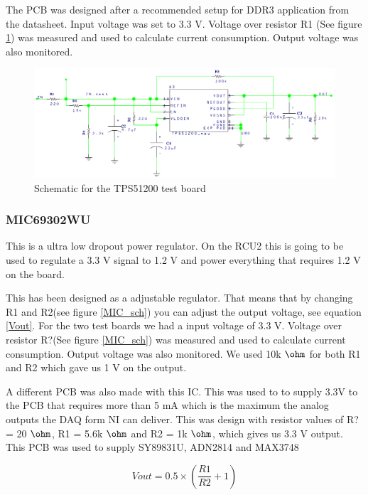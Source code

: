 \documentclass[12pt]{article}
\numberwithin{figure}{section}
\begin{document}
The PCB was designed after a recommended setup for DDR3 application from the datasheet. Input voltage was set to 3.3 V.
Voltage over resistor R1 (See figure \ref{TPS51200_sch}) was measured and used to calculate current consumption. Output voltage was also monitored.

\begin{figure}[!htbp]
  \centering
  \includegraphics[width=\textwidth]{TPS51200_sch.png}
  \caption{Schematic for the TPS51200 test board}
  \label{TPS51200_sch}
\end{figure}
\FloatBarrier

\subsubsection{MIC69302WU}
\label{MIC_explanation}
This is a ultra low dropout power regulator. On the \ac{RCU2} this is going to be used to regulate a 3.3 V signal to 1.2 V and power everything that requires 1.2 V on the board.

This has been designed as a adjustable regulator. That means that by changing R1 and R2(see figure \ref{MIC_sch}) you can adjust the output voltage, see equation \ref{Vout}. For the two test boards we had a input voltage of 3.3 V.
Voltage over resistor R?(See figure \ref{MIC_sch}) was measured and used to calculate current consumption. Output voltage was also monitored.
We used 10k $\ohm$ for both R1 and R2 which gave us 1 V on the output.

A different PCB was also made with this \ac{IC}. This was used to to supply 3.3V to the PCB that requires more than 5 mA which is the maximum the analog outputs the \ac{DAQ} form NI can deliver.
This was design with resistor values of R? = 20 $\ohm$, R1 = 5.6k $\ohm$ and R2 = 1k $\ohm$, which gives us 3.3 V output.
This \ac{PCB} was used to supply SY89831U, ADN2814 and MAX3748

\begin{equation}
Vout = 0.5 \times (\frac{R1}{R2}+1)
\label{Vout}
\end{equation}
\end{document}
